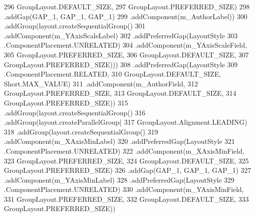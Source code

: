 \begin{DoxyCode}
296                                         GroupLayout.DEFAULT\_SIZE, 
297                                         GroupLayout.PREFERRED\_SIZE)
298                                 .addGap(GAP\_1, GAP\_1, GAP\_1)
299                                 .addComponent(m\_AuthorLabel))
300                             .addGroup(layout.createSequentialGroup()
301                                 .addComponent(m\_YAxisScaleLabel)
302                                 .addPreferredGap(LayoutStyle
303                                         .ComponentPlacement.UNRELATED)
304                                 .addComponent(m\_YAxisScaleField, 
305                                         GroupLayout.PREFERRED\_SIZE, 
306                                         GroupLayout.DEFAULT\_SIZE, 
307                                         GroupLayout.PREFERRED\_SIZE)))
308                         .addPreferredGap(LayoutStyle
309                                 .ComponentPlacement.RELATED,
310                                 GroupLayout.DEFAULT\_SIZE, Short.MAX\_VALUE)
311                         .addComponent(m\_AuthorField, 
312                                 GroupLayout.PREFERRED\_SIZE, 
313                                 GroupLayout.DEFAULT\_SIZE, 
314                                 GroupLayout.PREFERRED\_SIZE))
315                     .addGroup(layout.createSequentialGroup()
316                         .addGroup(layout.createParallelGroup(
317                                 GroupLayout.Alignment.LEADING)
318                             .addGroup(layout.createSequentialGroup()
319                                 .addComponent(m\_XAxisMinLabel)
320                                 .addPreferredGap(LayoutStyle
321                                         .ComponentPlacement.UNRELATED)
322                                 .addComponent(m\_XAxisMinField,
323                                         GroupLayout.PREFERRED\_SIZE, 
324                                         GroupLayout.DEFAULT\_SIZE, 
325                                         GroupLayout.PREFERRED\_SIZE)
326                                 .addGap(GAP\_1, GAP\_1, GAP\_1)
327                                 .addComponent(m\_YAxisMinLabel)
328                                 .addPreferredGap(LayoutStyle
329                                         .ComponentPlacement.UNRELATED)
330                                 .addComponent(m\_YAxisMinField, 
331                                         GroupLayout.PREFERRED\_SIZE, 
332                                         GroupLayout.DEFAULT\_SIZE, 
333                                         GroupLayout.PREFERRED\_SIZE))

\end{DoxyCode}
